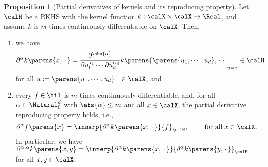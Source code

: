\documentclass[12pt]{article}
\theoremstyle{definition}
\theoremstyle{theorem}
\newtheorem{proposition}{Proposition}
\theoremstyle{remark}
\begin{document}
\begin{proposition}[Partial derivatives of kernels and its reproducing property]\label{prop-reproducing-derivative}
	Let $\calH$ be a RKHS with the kernel function $k: \calX \times \calX \to \Real$, and assume $k$ is $m$-times continuously differentiable on $\calX$. Then, 
	\begin{enumerate}[label=(\alph*)]
		\item we have 
		\begin{align}
			\partial^{\alpha} k \parens{x, \,\cdot\,} 
			= \frac{\partial^{\abs{\alpha}}}{\partial u_1^{\alpha_1} \cdots \partial u_d^{\alpha_d}} k \parens{\parens{u_1, \cdots, u_d}, \,\cdot\,}\bigg\vert_{u=x} \in \calH
		\end{align}
		for all $u := \parens{u_1, \cdots, u_d}^\top \in \calX$, and 
		\item every $f \in \hil$ is $m$-times continuously differentiable, and, for all $\alpha \in \Natural_0^d$ with $\abs{\alpha} \le m$ and all $x \in \calX$, the partial derivative reproducing property holds, i.e., 
		\begin{align}
			\partial^{\alpha} f \parens{x} = \innerp{\partial^{\alpha} k \parens{x, \,\cdot\,}}{f}_{\calH}, \qquad \text{ for all } x \in \calX. %
		\end{align}
		In particular, we have $\partial^{\alpha, \alpha} k \parens{x, y} = \innerp{\partial^{\alpha} k \parens{x, \,\cdot\,}}{\partial^{\alpha} k \parens{y,\,\cdot\,}}_{\calH}$ for all $x, y \in \calX$. 
	\end{enumerate}
\end{proposition}

%
%
%
%

\printbibliography
\end{document}

